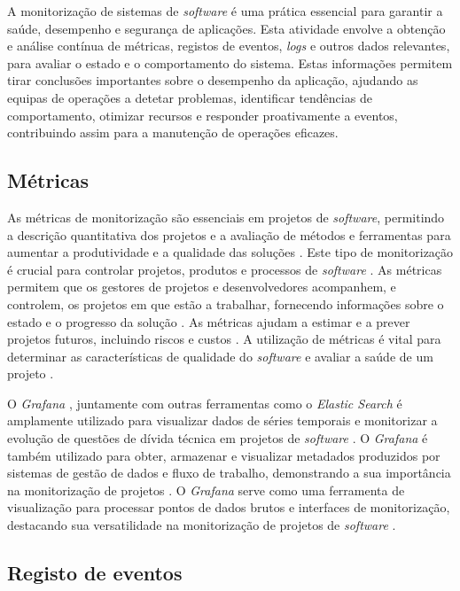 A monitorização de sistemas de \textit{software} é uma prática essencial para garantir a saúde, 
desempenho e segurança de aplicações. Esta atividade envolve a obtenção e análise contínua de métricas, 
registos de eventos, \textit{logs} e outros dados relevantes, para avaliar o estado e o comportamento 
do sistema. Estas informações permitem tirar conclusões importantes sobre o desempenho da aplicação, 
ajudando as equipas de operações a detetar problemas, identificar tendências de comportamento, 
otimizar recursos e responder proativamente a eventos, contribuindo assim para a manutenção de 
operações eficazes.

\subsection{Métricas}

As métricas de monitorização são essenciais em projetos de \textit{software}, permitindo a descrição 
quantitativa dos projetos e a avaliação de métodos e ferramentas para aumentar a produtividade e a 
qualidade das soluções \cite{metrics2003}. Este tipo de monitorização é crucial para controlar 
projetos, produtos e processos de \textit{software} \cite{metrics2019}. As métricas permitem que os 
gestores de projetos e desenvolvedores acompanhem, e controlem, os projetos em que estão a trabalhar,
fornecendo informações sobre o estado e o progresso da solução \cite{metrics2016}. As 
métricas ajudam a estimar e a prever projetos futuros, incluindo riscos e custos 
\cite{metrics2016b}. A utilização de métricas é vital para determinar as características de 
qualidade do \textit{software} e avaliar a saúde de um projeto \cite{metrics2015}.

O \textit{Grafana} \cite{grafana}, juntamente com outras ferramentas como o \textit{Elastic Search}
\cite{elastic-search} é amplamente utilizado para visualizar dados de séries temporais e monitorizar
a evolução de questões de dívida técnica em projetos de \textit{software} \cite{metrics2019b}. O 
\textit{Grafana} é também utilizado para obter, armazenar e visualizar metadados produzidos por 
sistemas de gestão de dados e fluxo de trabalho, demonstrando a sua importância na monitorização 
de projetos \cite{metrics2021}. O \textit{Grafana} serve como uma ferramenta de visualização para 
processar pontos de dados brutos e interfaces de monitorização, destacando sua versatilidade na 
monitorização de projetos de \textit{software} \cite{metrics2022}.

\subsection{Registo de eventos}

